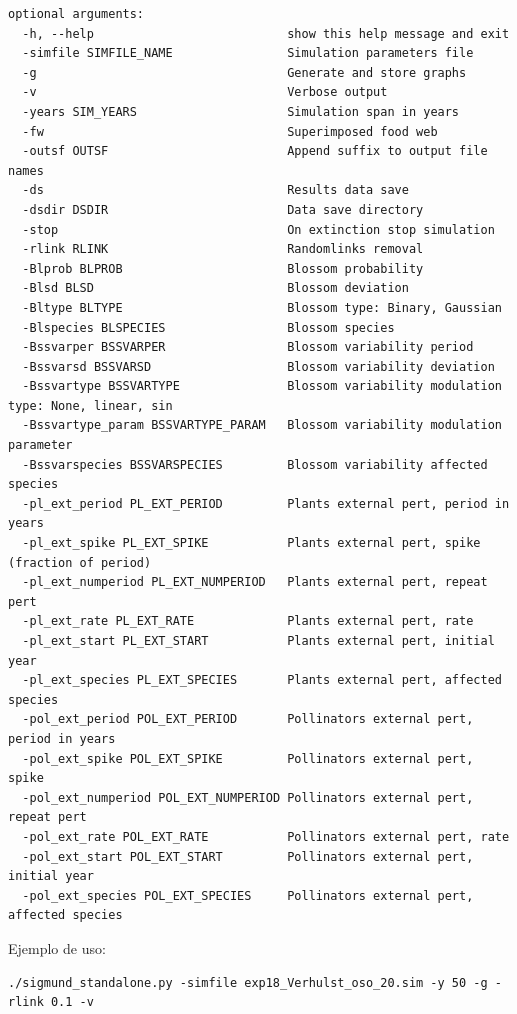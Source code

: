 \begin{verbatim}
optional arguments:
  -h, --help                           show this help message and exit
  -simfile SIMFILE_NAME                Simulation parameters file
  -g                                   Generate and store graphs
  -v                                   Verbose output
  -years SIM_YEARS                     Simulation span in years
  -fw                                  Superimposed food web
  -outsf OUTSF                         Append suffix to output file names
  -ds                                  Results data save
  -dsdir DSDIR                         Data save directory
  -stop                                On extinction stop simulation
  -rlink RLINK                         Randomlinks removal
  -Blprob BLPROB                       Blossom probability
  -Blsd BLSD                           Blossom deviation
  -Bltype BLTYPE                       Blossom type: Binary, Gaussian
  -Blspecies BLSPECIES                 Blossom species
  -Bssvarper BSSVARPER                 Blossom variability period
  -Bssvarsd BSSVARSD                   Blossom variability deviation
  -Bssvartype BSSVARTYPE 			   Blossom variability modulation type: None, linear, sin
  -Bssvartype_param BSSVARTYPE_PARAM   Blossom variability modulation parameter
  -Bssvarspecies BSSVARSPECIES 		   Blossom variability affected species
  -pl_ext_period PL_EXT_PERIOD         Plants external pert, period in years
  -pl_ext_spike PL_EXT_SPIKE           Plants external pert, spike (fraction of period)
  -pl_ext_numperiod PL_EXT_NUMPERIOD   Plants external pert, repeat pert
  -pl_ext_rate PL_EXT_RATE             Plants external pert, rate
  -pl_ext_start PL_EXT_START           Plants external pert, initial year
  -pl_ext_species PL_EXT_SPECIES       Plants external pert, affected species
  -pol_ext_period POL_EXT_PERIOD       Pollinators external pert, period in years
  -pol_ext_spike POL_EXT_SPIKE         Pollinators external pert, spike
  -pol_ext_numperiod POL_EXT_NUMPERIOD Pollinators external pert, repeat pert
  -pol_ext_rate POL_EXT_RATE           Pollinators external pert, rate
  -pol_ext_start POL_EXT_START         Pollinators external pert, initial year
  -pol_ext_species POL_EXT_SPECIES     Pollinators external pert, affected species
\end{verbatim}
\normalsize

Ejemplo de uso: 

\fontsize{3mm}{3mm}\selectfont
\begin{verbatim}
./sigmund_standalone.py -simfile exp18_Verhulst_oso_20.sim -y 50 -g -rlink 0.1 -v
\end{verbatim}
\normalsize

